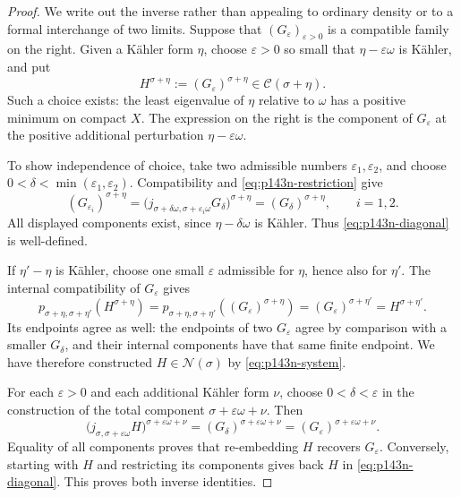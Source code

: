 \begin{proof}
We write out the inverse rather than appealing to ordinary density or
to a formal interchange of two limits. Suppose that
\((G_\varepsilon)_{\varepsilon>0}\) is a compatible family on the
right. Given a K\"ahler form \(\eta\), choose \(\varepsilon>0\)
so small that \(\eta-\varepsilon\omega\) is K\"ahler, and put
\begin{equation}\label{eq:p143n-diagonal}
 H^{\sigma+\eta}:=(G_\varepsilon)^{\sigma+\eta}
 \in\mathcal C(\sigma+\eta).
\end{equation}
Such a choice exists: the least eigenvalue of \(\eta\) relative to
\(\omega\) has a positive minimum on compact \(X\). The expression
on the right is the component of \(G_\varepsilon\) at the positive
additional perturbation \(\eta-\varepsilon\omega\).

To show independence of choice, take two admissible numbers
\(\varepsilon_1,\varepsilon_2\), and choose
\(0<\delta<\min(\varepsilon_1,\varepsilon_2)\). Compatibility and
\eqref{eq:p143n-restriction} give
\[
 (G_{\varepsilon_i})^{\sigma+\eta}
 =\bigl(j_{\sigma+\delta\omega,\sigma+\varepsilon_i\omega}
 G_\delta\bigr)^{\sigma+\eta}
 =(G_\delta)^{\sigma+\eta},\qquad i=1,2.
\]
All displayed components exist, since
\(\eta-\delta\omega\) is K\"ahler. Thus
\eqref{eq:p143n-diagonal} is well-defined.

If \(\eta'-\eta\) is K\"ahler, choose one small
\(\varepsilon\) admissible for \(\eta\), hence also for \(\eta'\).
The internal compatibility of \(G_\varepsilon\) gives
\[
 p_{\sigma+\eta,\sigma+\eta'}(H^{\sigma+\eta})
 =p_{\sigma+\eta,\sigma+\eta'}
       ((G_\varepsilon)^{\sigma+\eta})
 =(G_\varepsilon)^{\sigma+\eta'}=H^{\sigma+\eta'}.
\]
Its endpoints agree as well: the endpoints of two \(G_\varepsilon\)
agree by comparison with a smaller \(G_\delta\), and their internal
components have that same finite endpoint. We have therefore constructed
\(H\in\mathcal N(\sigma)\) by \eqref{eq:p143n-system}.

For each \(\varepsilon>0\) and each additional K\"ahler form
\(\nu\), choose \(0<\delta<\varepsilon\) in the construction of
the total component \(\sigma+\varepsilon\omega+\nu\). Then
\[
 \bigl(j_{\sigma,\sigma+\varepsilon\omega}H\bigr)
            ^{\sigma+\varepsilon\omega+\nu}
 =(G_\delta)^{\sigma+\varepsilon\omega+\nu}
 =(G_\varepsilon)^{\sigma+\varepsilon\omega+\nu}.
\]
Equality of all components proves that re-embedding \(H\) recovers
\(G_\varepsilon\). Conversely, starting with \(H\) and restricting
its components gives back \(H\) in \eqref{eq:p143n-diagonal}.
This proves both inverse identities.
\end{proof}

